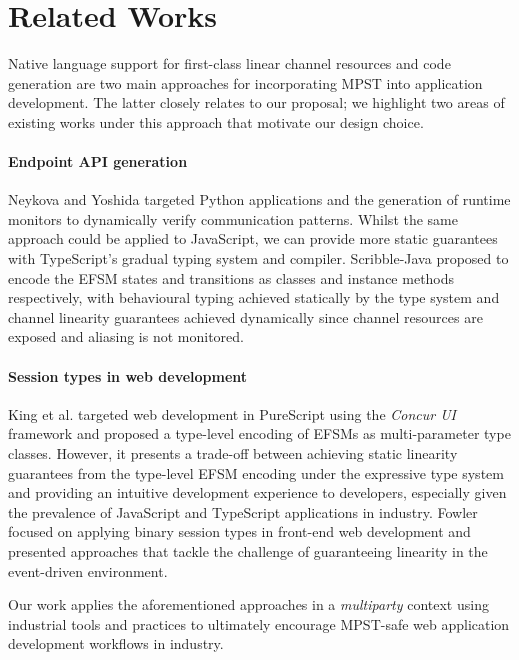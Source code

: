 \section{Related Works}
Native language support for first-class linear channel resources \cite{ATS} and
code generation are two main approaches for incorporating MPST into application
development.
The latter closely relates to our proposal;
we highlight two areas of existing works under this approach that motivate our
design choice.

\paragraph{Endpoint API generation}
Neykova and Yoshida targeted Python applications and the generation of runtime
monitors \cite{Python2017} to dynamically verify communication patterns.
Whilst the same approach could be applied to JavaScript, we can provide more
static guarantees with TypeScript's gradual typing system and compiler. Scribble-Java \cite{Hybrid2016} proposed to encode the EFSM
states and transitions as classes and instance methods respectively, with
behavioural typing achieved statically by the type system and channel linearity
guarantees achieved dynamically since channel resources are exposed and
aliasing is not monitored.

\paragraph{Session types in web development}
King et al. \cite{PureScript2019} targeted web development in PureScript using the
\textit{Concur UI} framework and proposed a type-level encoding of EFSMs as
multi-parameter type classes.
However, it presents a trade-off between achieving static linearity guarantees
from the type-level EFSM encoding under the expressive type system and
providing an intuitive development experience to developers, especially given
the prevalence of JavaScript and TypeScript applications in industry. Fowler \cite{MVU2019} focused on applying binary session types in front-end web
development and presented approaches that tackle the challenge of guaranteeing
linearity in the event-driven environment.

Our work applies the aforementioned approaches in a \textit{multiparty} context
using industrial tools and practices to ultimately encourage MPST-safe web
application development workflows in industry.


